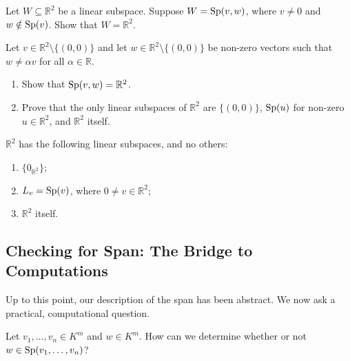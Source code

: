 \begin{exercise}
\label{exc:two_vectors_span_plane}
Let $W \subseteq \mathbb{R}^2$ be a linear subspace. Suppose $W = \operatorname{Sp}(v, w)$, where $v \ne 0$ and $w \notin \operatorname{Sp}(v)$. Show that $W = \mathbb{R}^2$.
\end{exercise}

\begin{exercise}
\label{exc:subspaces_two_dimensions}
Let $v \in \mathbb{R}^2 \setminus \{(0, 0)\}$ and let $w \in \mathbb{R}^2 \setminus \{(0, 0)\}$ be non-zero vectors such that $w \ne \alpha v$ for all $\alpha \in \mathbb{R}$.
\begin{enumerate}
    \item Show that $\operatorname{Sp}(v, w) = \mathbb{R}^2$.
    \item Prove that the only linear subspaces of $\mathbb{R}^2$ are $\{(0, 0)\}$, $\operatorname{Sp}(u)$ for non-zero $u \in \mathbb{R}^2$, and $\mathbb{R}^2$ itself.
\end{enumerate}
\end{exercise}

\begin{summary}
\label{sum:subspaces_of_plane}
$\mathbb{R}^2$ has the following linear subspaces, and no others:
\begin{enumerate}[label=\textbf{(\alph*)}]
    \item $\{0_{\mathbb{R}^2}\}$;
    \item $L_v = \operatorname{Sp}(v)$, where $0 \ne v \in \mathbb{R}^2$;
    \item $\mathbb{R}^2$ itself.
\end{enumerate}
\end{summary}

\subsection{Checking for Span: The Bridge to Computations}

Up to this point, our description of the span has been abstract. We now ask a practical, computational question.

\begin{question}
\label{q:membership_in_span}
Let $v_1, \dots, v_n \in K^m$ and $w \in K^m$. How can we determine whether or not $w \in \operatorname{Sp}(v_1, \dots, v_n)$?
\end{question}

